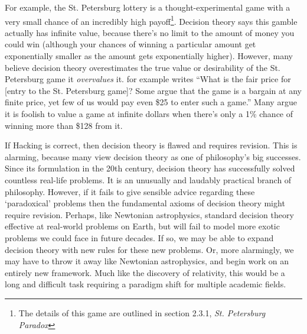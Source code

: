 \documentclass{article}
\begin{document}
For example, the St. Petersburg lottery is a thought-experimental game with a very small chance of an incredibly high payoff\footnote{The details of this game are outlined in section 2.3.1, \textit{St. Petersburg Paradox}}. Decision theory says this gamble actually has infinite value, because there's no limit to the amount of money you could win (although your chances of winning a particular amount get exponentially smaller as the amount gets exponentially higher). However, many believe decision theory overestimates the true value or desirability of the St. Petersburg game \textemdash{} it \textit{overvalues} it. \citep{hacking1980strange} for example writes ``What is the fair price for [entry to the St. Petersburg game]? Some argue that the game is a bargain at any finite price, yet few of us would pay even \$25 to enter such a game.'' Many argue it is foolish to value a game at infinite dollars when there's only a 1\% chance of winning more than \$128 from it.

If Hacking is correct, then decision theory is flawed and requires revision. This is alarming, because many view decision theory as one of philosophy's big successes. Since its formulation in the 20th century, decision theory has successfully solved countless real-life problems. It is an unusually and laudably practical branch of philosophy. However, if it fails to give sensible advice regarding these `paradoxical' problems then the fundamental axioms of decision theory might require revision. Perhaps, like Newtonian astrophysics, standard decision theory effective at real-world problems on Earth, but will fail to model more exotic problems we could face in future decades. If so, we may be able to expand decision theory with new rules for these new problems. Or, more alarmingly, we may have to throw it away like Newtonian astrophysics, and begin work on an entirely new framework. Much like the discovery of relativity, this would be a long and difficult task requiring a paradigm shift for multiple academic fields.
\end{document}
